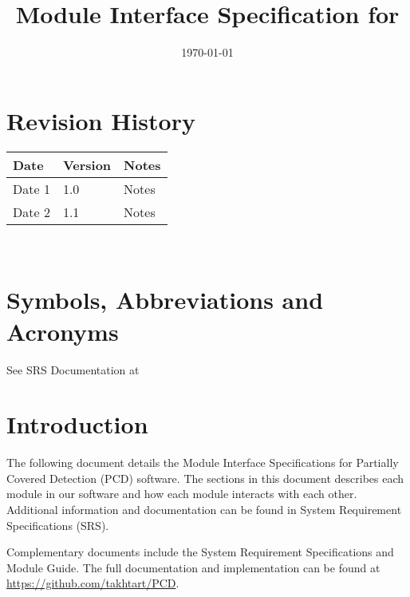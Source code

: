 \documentclass[12pt, titlepage]{article}
\begin{document}
\title{Module Interface Specification for \progname{}}

\author{\authname}

\date{\today}

\maketitle


\section{Revision History}

\begin{tabularx}{\textwidth}{p{3cm}p{2cm}X}
\toprule {\bf Date} & {\bf Version} & {\bf Notes}\\
\midrule
Date 1 & 1.0 & Notes\\
Date 2 & 1.1 & Notes\\
\bottomrule
\end{tabularx}

~\newpage

\section{Symbols, Abbreviations and Acronyms}

See SRS Documentation at 


\newpage

\tableofcontents

\newpage


\section{Introduction}

The following document details the Module Interface Specifications for Partially Covered Detection (PCD) software. 
The sections in this document describes each module in our software and how each module interacts with each other. 
Additional information and documentation can be found in System Requirement Specifications (SRS).

Complementary documents include the System Requirement Specifications
and Module Guide.  The full documentation and implementation can be
found at \url{https://github.com/takhtart/PCD}. 
\end{document}
